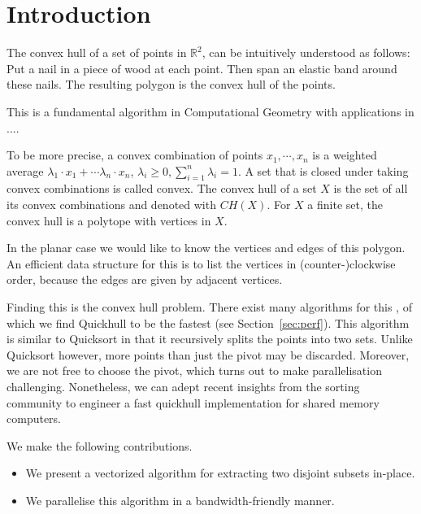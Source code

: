\section{Introduction}

The convex hull of a set of points in $\mathbb{R}^2$, can be intuitively 
understood as follows: Put a nail in a piece of wood at each point. Then span 
an elastic band around these nails. The resulting polygon is the convex hull of 
the points.

This is a fundamental algorithm in Computational Geometry with applications
in .... 

To be more precise, a convex combination of points $x_1, \cdots, x_n$ is a 
weighted average $\lambda_1 \cdot x_1 + \cdots \lambda_n \cdot x_n$, 
$\lambda_i \geq 0, \sum_{i = 1}^n \lambda_i = 1$. A set that is closed under
taking convex combinations is called convex. The convex hull of a set $X$ is
the set of all its convex combinations and denoted with $CH(X)$. For $X$
a finite set, the convex hull is a polytope with vertices in $X$.

In the planar case we would like to know the vertices and edges of this polygon.
An efficient data structure for this is to list the vertices in
(counter-)clockwise order, because the edges are given by adjacent vertices.

Finding this is the convex hull problem. There exist many algorithms for this
\cite{}, of which we find Quickhull to be the fastest (see 
Section~\ref{sec:perf}). This algorithm is similar to Quicksort in that
it recursively splits the points into two sets. Unlike Quicksort however,
more points than just the pivot may be discarded. Moreover, we are not
free to choose the pivot, which turns out to make parallelisation challenging.
Nonetheless, we can adept recent insights from the sorting community to engineer
a fast quickhull implementation for shared memory computers.

We make the following contributions.

\begin{itemize}
    \item We present a vectorized algorithm for extracting two disjoint 
          subsets in-place.
    \item We parallelise this algorithm in a bandwidth-friendly manner.
\end{itemize}

